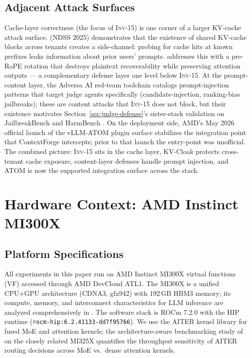 \documentclass[10pt,twocolumn]{article}
\newcommand{\INV}[1]{\textsc{Inv-#1}}
\begin{document}
\subsection{Adjacent Attack Surfaces}
\label{sec:bg:attack}

Cache-layer correctness (the focus of \INV{15}) is one corner of a larger
KV-cache attack surface. \cite{kvcacheleak} (NDSS 2025) demonstrates that
the existence of shared KV-cache blocks across tenants creates a
side-channel: probing for cache hits at known prefixes leaks information
about prior users' prompts. \cite{kvcloak} addresses this with a pre-RoPE
rotation that destroys plaintext recoverability while preserving
attention outputs --- a complementary defense layer one level below
\INV{15}. At the prompt-content layer, the Adversa AI red-team toolchain
\cite{adversa} catalogs prompt-injection patterns that target judge agents
specifically (candidate-injection, ranking-bias jailbreaks); these are
content attacks that \INV{15} does not block, but their existence
motivates Section~\ref{sec:judge-defense}'s sister-stack validation
on JailbreakBench \cite{jailbreakbench} and HarmBench \cite{harmbench}.
On the deployment side, AMD's May 2026 official launch of the vLLM-ATOM
plugin surface \cite{amdvllmatom} stabilizes the integration point that
ContextForge intercepts; prior to that launch the entry-point was
unofficial. The combined picture: \INV{15} sits in the cache layer,
KV-Cloak protects cross-tenant cache exposure, content-layer defenses
handle prompt injection, and ATOM is now the supported integration
surface across the stack.

\section{Hardware Context: AMD Instinct MI300X}
\label{sec:hardware}

\subsection{Platform Specifications}
\label{sec:hardware:specs}

All experiments in this paper run on AMD Instinct MI300X virtual functions
(VF) accessed through AMD DevCloud ATL1. The MI300X is a unified CPU+GPU
architecture (CDNA3, gfx942) with $192\,\mathrm{GB}$ HBM3 memory; its
compute, memory, and interconnect characteristics for LLM inference are
analyzed comprehensively in \cite{mi300xperf}. The software stack is
ROCm 7.2.0 with the HIP runtime
(\texttt{rocm-hip:6.2.41133-dd7f95766}). We use the AITER kernel library
\cite{aiter} for fused MoE and attention kernels; the architecture-aware
benchmarking study of \cite{archawareamd} on the closely related MI325X
quantifies the throughput sensitivity of AITER routing decisions across
MoE vs.\ dense attention kernels.
\end{document}
